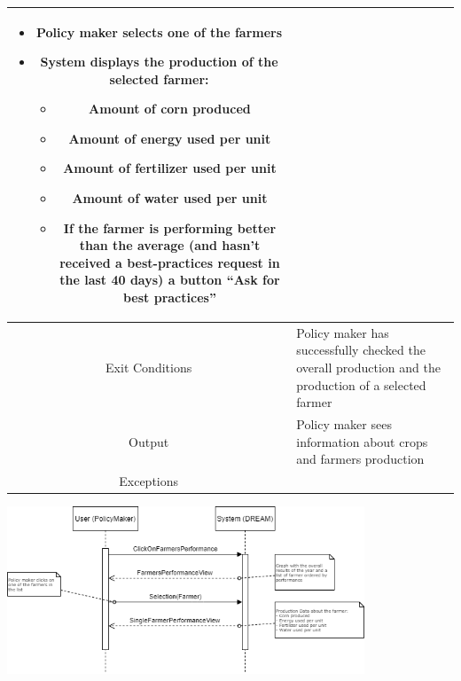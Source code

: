 \documentclass{article}
\begin{document}
\begin{center}
\begin{longtable}{|c| p{10cm}|}
\begin{itemize}
                                \item Policy maker selects one of the farmers
                                \item System displays the production of the selected farmer:
                                                \begin{itemize}
                                                    \item Amount of corn produced
                                                    \item Amount of energy used per unit
                                                    \item Amount of fertilizer used per unit
                                                    \item Amount of water used per unit 
                                                    \item If the farmer is performing better than the average (and hasn’t received a best-practices request in the last 40 days) a button “Ask for best practices”
                                                \end{itemize}
                            \end{itemize} \\
        \hline
            Exit Conditions & Policy maker has successfully checked the overall production and the production of a selected farmer \\
        \hline
            Output & Policy maker sees information about crops and farmers production\\
        \hline
            Exceptions &  \\
        \hline
    \end{longtable}
    
    \includegraphics[width=0.8\textwidth]{images/sequenceDiagrams/21. PolicyMakerVisualizeFarmerPerformance.png}
    \par
    \caption{\label{fig:frog}Policy Maker Visualize Performance Data of Farmers}


\end{center}
\end{document}

